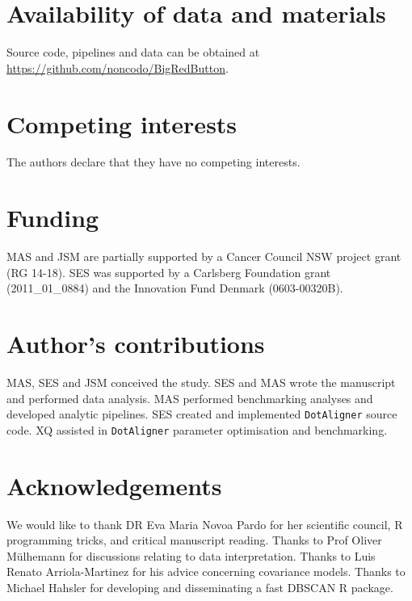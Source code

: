 \documentclass{bmcart}
\newcommand\dotaligner{\texttt{DotAligner}}
\begin{document}
\begin{backmatter}
\section*{Availability of data and materials}
Source code, pipelines and data can be obtained at \url{https://github.com/noncodo/BigRedButton}. 

\section*{Competing interests}
 The authors declare that they have no competing interests.

\section*{Funding}
MAS and JSM are partially supported  by a Cancer Council NSW project grant (RG 14-18). 
SES was supported by a Carlsberg Foundation grant (2011\_01\_0884) and the Innovation Fund Denmark (0603-00320B). 

\section*{Author's contributions}
MAS, SES and JSM conceived the study. 
SES and MAS wrote the manuscript and performed data analysis. 
MAS performed benchmarking analyses and developed analytic pipelines. 
SES created and implemented \dotaligner{} source code. 
XQ assisted in \dotaligner{}  parameter optimisation and benchmarking. 

\section*{Acknowledgements}
We would like to thank DR Eva Maria Novoa Pardo for her scientific council, 
R programming tricks, and critical manuscript reading. 
Thanks to Prof Oliver M\"ulhemann for discussions relating to data interpretation.  
Thanks to Luis Renato Arriola-Martinez for his advice concerning covariance models. 
Thanks to Michael Hahsler for developing and disseminating a fast DBSCAN R package.




\end{backmatter}
\end{document}
